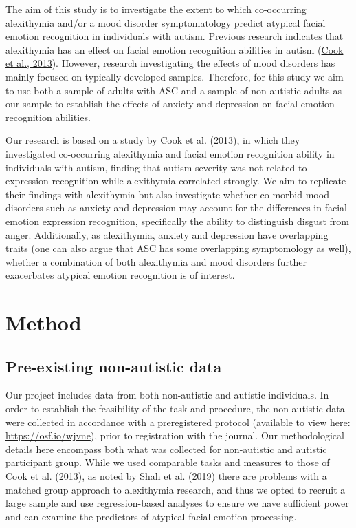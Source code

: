 \documentclass[
]{article}
\begin{document}
The aim of this study is to investigate the extent to which co-occurring alexithymia and/or a mood disorder symptomatology predict atypical facial emotion recognition in individuals with autism. Previous research indicates that alexithymia has an effect on facial emotion recognition abilities in autism (\protect\hyperlink{ref-cook2013a}{Cook et al., 2013}). However, research investigating the effects of mood disorders has mainly focused on typically developed samples. Therefore, for this study we aim to use both a sample of adults with ASC and a sample of non-autistic adults as our sample to establish the effects of anxiety and depression on facial emotion recognition abilities.

Our research is based on a study by Cook et al. (\protect\hyperlink{ref-cook2013a}{2013}), in which they investigated co-occurring alexithymia and facial emotion recognition ability in individuals with autism, finding that autism severity was not related to expression recognition while alexithymia correlated strongly. We aim to replicate their findings with alexithymia but also investigate whether co-morbid mood disorders such as anxiety and depression may account for the differences in facial emotion expression recognition, specifically the ability to distinguish disgust from anger. Additionally, as alexithymia, anxiety and depression have overlapping traits (one can also argue that ASC has some overlapping symptomology as well), whether a combination of both alexithymia and mood disorders further exacerbates atypical emotion recognition is of interest.

\hypertarget{method}{%
\section*{Method}\label{method}}

\hypertarget{pre-existing-non-autistic-data}{%
\subsection*{Pre-existing non-autistic data}\label{pre-existing-non-autistic-data}}

Our project includes data from both non-autistic and autistic individuals. In order to establish the feasibility of the task and procedure, the non-autistic data were collected in accordance with a preregistered protocol (available to view here: \url{https://osf.io/wjvne}), prior to registration with the journal. Our methodological details here encompass both what was collected for non-autistic and autistic participant group. While we used comparable tasks and measures to those of Cook et al. (\protect\hyperlink{ref-cook2013a}{2013}), as noted by Shah et al. (\protect\hyperlink{ref-shah2019a}{2019}) there are problems with a matched group approach to alexithymia research, and thus we opted to recruit a large sample and use regression-based analyses to ensure we have sufficient power and can examine the predictors of atypical facial emotion processing.
\end{document}

